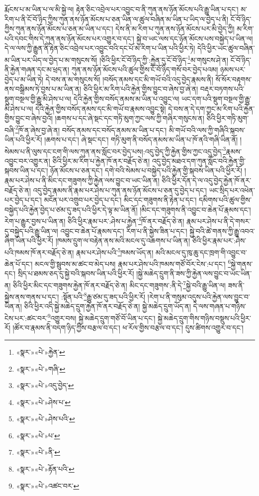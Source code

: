 རྨོངས་པ་མ་ཡིན་པ་ལ་མི་སྐྱེ་ལ། རྟེན་ཅིང་འབྲེལ་པར་འབྱུང་བ་ནི་ཀུན་ནས་ཉོན་མོངས་པའི་རྒྱུ་ཡིན་པ་དང་། མ་རིག་པ་ནི་ངོ་བོ་ཉིད་ཀྱིས་ཀུན་ནས་ཉོན་མོངས་པ་ཅན་ཡིན་ལ་ཚུལ་བཞིན་མ་ཡིན་པ་ཡིད་ལ་བྱེད་པ་ནི། ངོ་བོ་ཉིད་ཀྱིས་ཀུན་ནས་ཉོན་མོངས་པ་ཅན་མ་ཡིན་པ་དང་། དེས་ནི་མ་རིག་པ་ཀུན་ནས་ཉོན་མོངས་པར་མི་བྱེད་ཀྱི། མ་རིག་པའི་དབང་གིས་དེ་ཀུན་ནས་ཉོན་མོངས་པར་འགྱུར་བ་དང་། སྐྱེ་བ་ཡང་ལས་དང་ཉོན་མོངས་པས་བསྐྱེད་པ་ཡིན་ལ། དེ་ལ་ལས་ཀྱི་རྒྱུན་ནི་རྟེན་ཅིང་འབྲེལ་པར་འབྱུང་བའི་དང་པོ་མ་རིག་པ་ཡིན་པའི་ཕྱིར་ཏེ། དེའི་ཕྱིར་ཡང་ཚུལ་བཞིན་མ་ཡིན་པར་ཡིད་ལ་བྱེད་པ་མ་གསུངས་སོ། །ཅིའི་ཕྱིར་ངོ་བོ་ཉིད་ཀྱི་:རྐྱེན་དུ་ངོ་བོ་ཉིད་\footnote{«སྣར་»«པེ་»རྐྱེན་}མ་གསུངས་ཤེ་ན། ངོ་བོ་ཉིད་ནི་རྐྱེན་གཞན་དང་མ་ཕྲད་ན། ཀུན་ནས་ཉོན་མོངས་པའི་ཚུལ་གྱིས་ངོ་བོ་ཉིད་གསོ་བར་བྱེད་པའམ། ཉམས་པར་བྱེད་པ་མ་ཡིན་ཏེ། དེ་བས་ན་མ་གསུངས་སོ། །བསོད་ནམས་དང་མི་གཡོ་བའི་འདུ་བྱེད་རྣམས་ནི། སོ་སོར་བརྟགས་ནས་བསྒྲིམས་ཏེ་བྱས་པ་མ་ཡིན་ན། ཅིའི་ཕྱིར་མ་རིག་པའི་རྐྱེན་གྱིས་བྱུང་བ་ཞེས་བྱ་ཞེ་ན། བརྡར་བཏགས་པའི་སྡུག་བསྔལ་གྱི་རྒྱུ་མི་ཤེས་པ་ལ། དེའི་རྐྱེན་གྱིས་བསོད་ནམས་མ་ཡིན་པ་འབྱུང་ལ། ཡང་དག་པའི་སྡུག་བསྔལ་གྱི་རྒྱུ་མི་ཤེས་པ་ལ། དེའི་རྐྱེན་གྱིས་བསོད་ནམས་དང་མི་གཡོ་བ་རྣམས་འབྱུང་སྟེ། དེ་བས་ན་དེ་དག་ཀྱང་མ་རིག་པའི་རྐྱེན་གྱིས་བྱུང་བ་ཞེས་བྱའོ། །ཆགས་པ་དང་ཞེ་སྡང་དང་གཏི་མུག་ཀྱང་ལས་ཀྱི་གཞིར་གསུངས་ན། ཅིའི་ཕྱིར་གཏི་མུག་བཞི་\footnote{«སྣར་»«པེ་»གཞི་}ཁོ་ན་ཞེས་བྱ་ཞེ་ན། བསོད་ནམས་དང་བསོད་ནམས་མ་ཡིན་པ་དང་། མི་གཡོ་བའི་ལས་ཀྱི་གཞིའི་སྐབས་ཡིན་པའི་ཕྱིར་རོ། །ཆགས་པ་དང་། ཞེ་སྡང་དང་། གཏི་མུག་ནི་བསོད་ནམས་མ་ཡིན་པ་ཁོ་ནའི་གཞི་ཡིན་ནོ། །སེམས་པ་ནི་ལུས་དང་ངག་གི་ལས་ཀུན་ནས་སློང་བར་བྱེད་པས།:འདུ་བྱེད་ཀྱི་རྐྱེན་གྱིས་ཀྱང་འདུ་བྱེད་\footnote{«སྣར་»«པེ་»འདུ་བྱེད་}རྣམས་འབྱུང་བར་འགྱུར་ན། ཅིའི་ཕྱིར་མ་རིག་པ་རྐྱེན་ཁོ་ནར་བརྗོད་ཅེ་ན། འདུ་བྱེད་མཐའ་དག་ཀུན་སློང་བའི་རྐྱེན་གྱི་སྐབས་ཡིན་པ་དང་། ཉོན་མོངས་པ་ཅན་དང་། དགེ་བའི་སེམས་པ་བསྐྱེད་པའི་རྐྱེན་གྱི་སྐབས་ཡིན་པའི་ཕྱིར་རོ། །རྣམ་པར་ཤེས་པ་ནི་མིང་དང་གཟུགས་ཀྱི་རྐྱེན་ལས་བྱུང་བ་ཡང་ཡིན་ན། ཅིའི་ཕྱིར་དོན་དེ་ལ་འདུ་བྱེད་རྐྱེན་ཁོ་ནར་བརྗོད་ཅེ་ན། འདུ་བྱེད་རྣམས་ནི་རྣམ་པར་ཤེས་པ་ཀུན་ནས་ཉོན་མོངས་པ་ཅན་དུ་བྱེད་པ་དང་། ཡང་སྲིད་པར་འཕེན་པར་བྱེད་པ་དང་། མངོན་པར་འགྲུབ་པར་བྱེད་པ་དང་། མིང་དང་གཟུགས་ནི་རྟེན་པ་དང་། དམིགས་པའི་ཚུལ་གྱིས་བསྐྱེད་པའི་རྐྱེན་བྱེད་པ་ཙམ་དུ་ཟད་པའི་ཕྱིར་དེ་ལྟ་མ་ཡིན་ནོ། །མིང་དང་གཟུགས་ནི་འབྱུང་བ་ཆེན་པོ་རྣམས་དང་། རེག་པ་རྒྱུར་བྱས་པ་ཡིན་ན། ཅིའི་ཕྱིར་རྣམ་པར་:ཤེས་པ་རྐྱེན་\footnote{«སྣར་»«པེ་»ཤེས་པ་}ཁོ་ནར་བརྗོད་ཅེ་ན། རྣམ་པར་ཤེས་པ་ནི་དེ་གསར་དུ་བསྐྱེད་པའི་རྒྱུ་ཡིན་ལ། འབྱུང་བ་ཆེན་པོ་རྣམས་དང་། རིག་པ་ནི་སྐྱེས་ཟིན་པ་དང་། སྐྱེ་བའི་ཚེ་གནས་ཀྱི་རྒྱུ་འབའ་ཞིག་ཡིན་པའི་ཕྱིར་རོ། །ཁམས་དྲུག་ལ་བརྟེན་ནས་མའི་མངལ་དུ་འཆགས་པ་ཡིན་ན། ཅིའི་ཕྱིར་རྣམ་པར་:ཤེས་པའི་ཁམས་ཁོ་ནར་བརྗོད་ཅེ་ན། རྣམ་པར་ཤེས་པའི་\footnote{«སྣར་»«པེ་»ཤེས་པའི་}ཁམས་ཡོད་ན། མའི་མངལ་དུ་ཁུ་ཆུ་དང་ཁྲག་གི་འབྱུང་བ་ཆེན་པོ་དང་། མངལ་གྱི་སྦུབས་མ་ཚང་བ་མེད་པས། རྣམ་པར་ཤེས་པའི་ཁམས་གཙོ་བོར་ངེས་:པ་དང་། \footnote{«སྣར་»«པེ་»པ་}སྐྱེ་གནས་དང་། སྲིད་པ་ཐམས་ཅད་དུ་སྐྱེ་བའི་སྐབས་ཡིན་པའི་ཕྱིར་རོ། །སྐྱེ་མཆེད་དྲུག་ནི་ཟས་ཀྱི་རྐྱེན་ལས་བྱུང་བ་ཡང་ཡིན་ན། ཅིའི་ཕྱིར་མིང་དང་གཟུགས་རྐྱེན་ཁོ་ནར་བརྗོད་ཅེ་ན། མིང་དང་གཟུགས་:ནི་དེ་\footnote{«སྣར་»«པེ་»ནི་}སྐྱེ་བའི་རྒྱུ་ཡིན་ལ། ཟས་ནི་སྐྱེས་ནས་གནས་པ་དང་། :སྟོན་པའི་\footnote{«སྣར་»«པེ་»རྟོན་པའི་}རྒྱུ་ཙམ་དུ་ཟད་པའི་ཕྱིར་རོ། །རེག་པ་ནི་གསུམ་འདུས་པའི་རྐྱེན་ལས་བྱུང་བ་ཡིན་ན། ཅིའི་ཕྱིར་འདི་སྐྱེ་མཆེད་དྲུག་རྐྱེན་ཁོ་ནར་བརྗོད་ཅེ་ན། སྐྱེ་མཆེད་དྲུག་ཡོད་ན། དེ་ལས་གཞན་པ་གཉིས་ངེས་པར་:ཚང་བར་\footnote{«སྣར་»«པེ་»འཚང་བར་}འགྱུར་བས། སྐྱེ་མཆེད་དྲུག་གཙོ་བོ་ཡིན་པ་དང་། སྐྱེ་མཆེད་དྲུག་གིས་གཉིས་བསྡུས་པའི་ཕྱིར་རོ། །ཚོར་བ་རྣམས་ནི་བདག་ཉིད་ཀྱིས་བརྩལ་བ་དང་། ཕ་རོལ་གྱིས་བརྩལ་བ་དང་། དུས་ཚིགས་འགྱུར་བ་དང་། 